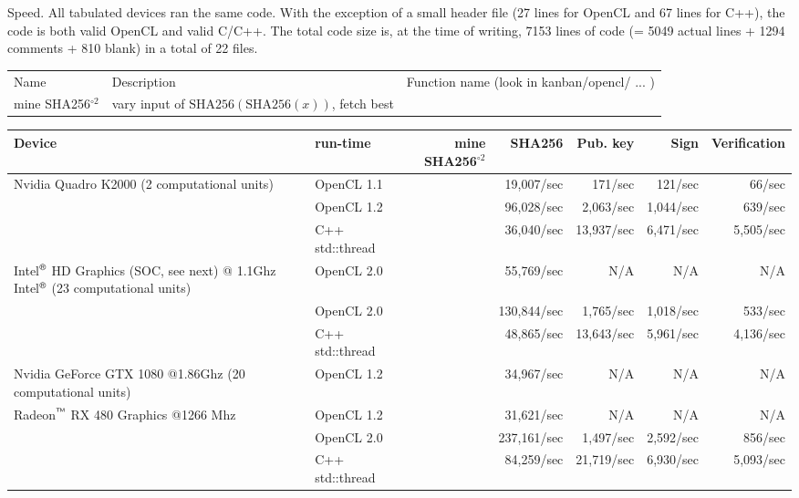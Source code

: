 \documentclass{article}
\begin{document}
Speed. All tabulated devices ran the same code. With the exception of a small header file (27 lines for OpenCL and 67 lines for C++), the code is both valid OpenCL and valid C/C++. The total code size is, at the time of writing, 7153 lines of code (= 5049 actual lines + 1294 comments + 810 blank) in a total of 22 files.


\begin{tabular}{lll}
Name & Description & Function name (look in kanban/opencl/ ... )\\
mine SHA256$^{\circ2}$& vary input of  $\text{SHA256}(\text{SHA256}(x))$, fetch best\\
\end{tabular}

\noindent\begin{tabular}{|p{5.5cm}|l|r|r||r|r|r|}\hline
Device & run-time &mine SHA256$^{\circ2}$& SHA256 & Pub. key & Sign & Verification\\\hline
Nvidia Quadro K2000 (2 computational units) & OpenCL 1.1 & &19,007/sec & 171/sec & 121/sec & 66/sec\\\hline
{} & OpenCL 1.2 & &96,028/sec & 2,063/sec& 1,044/sec & 639/sec\\
& C++ std::thread& & 36,040/sec&13,937/sec&6,471/sec&5,505/sec \\\hline\hline
Intel${}^{\text{\sffamily\textregistered}}$ HD Graphics (SOC, see next) @ 1.1Ghz Intel${}^{\text{\sffamily\textregistered}}$ (23 computational units) & OpenCL 2.0& & 55,769/sec& N/A & N/A& N/A \\\hline
{} & OpenCL 2.0 & &130,844/sec& 1,765/sec &1,018/sec& 533/sec\\
&C++ std::thread&  &48,865/sec& 13,643/sec&5,961/sec&4,136/sec \\\hline\hline
Nvidia GeForce GTX 1080 @1.86Ghz (20 computational units)&OpenCL 1.2& &34,967/sec&N/A&N/A&N/A\\\hline

Radeon${}^{\text{\sffamily\texttrademark}}$ RX 480 Graphics @1266 Mhz &OpenCL 1.2&  &31,621/sec& N/A & N/A& N/A
\\\hline

&OpenCL 2.0&  &237,161/sec & 1,497/sec & 2,592/sec&  856/sec\\
&C++ std::thread &&84,259/sec&21,719/sec&6,930/sec&5,093/sec\\\hline
\end{tabular}
\end{document}
